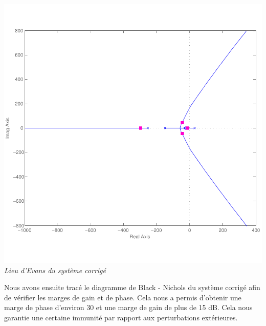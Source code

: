 \documentclass[11pt, french]{article} %
\begin{document}
\begin{center}
\includegraphics[scale=0.50]{RL_Sys_AvPh_K27.pdf}\\
\vspace{-15pt}
\emph{Lieu d'Evans du système corrigé}
\end{center}

Nous avons ensuite tracé le diagramme de Black - Nichols du système corrigé afin de vérifier les marges de gain et de phase. Cela nous a permis d'obtenir une marge de phase d'environ 30 et une marge de gain de plus de 15 dB. Cela nous garantie une certaine immunité par rapport aux perturbations extérieures.
\end{document}
